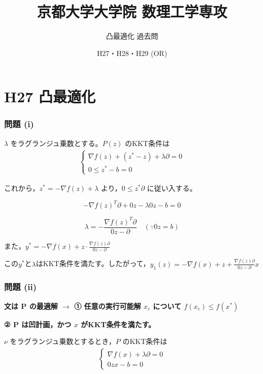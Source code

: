 \documentclass[12pt,a4paper]{article}
\title{京都大学大学院 数理工学専攻}
\author{凸最適化 過去問}
\date{H27・H28・H29 (OR)}
\begin{document}
\maketitle

\tableofcontents
\newpage

\part*{H27 凸最適化}

\section*{問題 (i)}

$\lambda$ をラグランジュ乗数とする。$P(z)$ のKKT条件は
\begin{align}
\begin{cases}
\nabla f(z) + (z^* - z) + \lambda \partial = 0 \\
0 \leq z^* - b = 0
\end{cases}
\end{align}

これから，$z^* = - \nabla f(z) + \lambda$ より，$0 \leq z^* \partial$ に従い入する。

\[-\nabla f(z)^T \partial + 0z - \lambda 0z - b = 0\]

\[\lambda = - \frac{\nabla f(z)^T \partial}{0z - \partial}\quad (\because 0z = b)\]

また，$y^* = -\nabla f(x) + z \cdot \frac{\nabla f(z) \partial}{0z - \partial}$

この$y^*$と$\lambda$はKKT条件を満たす。したがって，$y_1(z) = -\nabla f(x) + z + \frac{\nabla f(z)\partial}{0z - \partial} x$

\section*{問題 (ii)}

\textbf{文は P の最適解 $\rightarrow$ ① 任意の実行可能解 $x_c$ について $f(x_c) \leq f(x^*)$}

\textbf{② P は凹計画，かつ $x$ がKKT条件を満たす。}

$\nu$ をラグランジュ乗数とするとき，$P$ のKKT条件は
\begin{align}
\begin{cases}
\nabla f(x) + \lambda \partial = 0 \\
0z x - b = 0
\end{cases}
\end{align}
\end{document}
